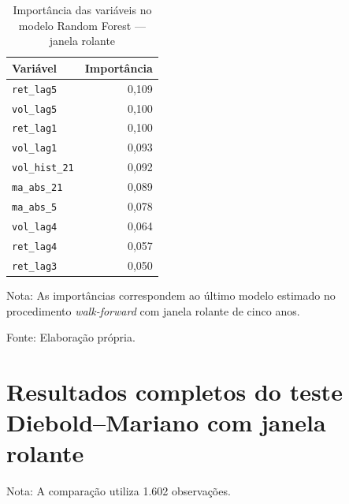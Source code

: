 \begin{table}[H]
    \centering
    \caption{Importância das variáveis no modelo Random Forest --- janela rolante}
    \label{tab:importancia_rf_rolante}
    \begin{tabular}{lr}
        \toprule
        Variável & Importância \\
        \midrule
        \texttt{ret\_lag5}    & 0,109 \\
        \texttt{vol\_lag5}    & 0,100 \\
        \texttt{ret\_lag1}    & 0,100 \\
        \texttt{vol\_lag1}    & 0,093 \\
        \texttt{vol\_hist\_21} & 0,092 \\
        \texttt{ma\_abs\_21}  & 0,089 \\
        \texttt{ma\_abs\_5}   & 0,078 \\
        \texttt{vol\_lag4}    & 0,064 \\
        \texttt{ret\_lag4}    & 0,057 \\
        \texttt{ret\_lag3}    & 0,050 \\
        \bottomrule
    \end{tabular}
    \begin{center}
        \footnotesize 
        Nota: As importâncias correspondem ao último modelo estimado no procedimento 
        \textit{walk-forward} com janela rolante de cinco anos.
        
        Fonte: Elaboração própria.
    \end{center}
\end{table}

\FloatBarrier
\section{Resultados completos do teste Diebold–Mariano com janela rolante}

\begin{table}[H]
    \centering
    \caption{Resultados completos do teste Diebold--Mariano para MSE --- janela rolante}
    \label{tab:dm_mse_rolante_completo}
    \small
    \par\vspace{2pt}
    {\footnotesize Nota: A comparação utiliza 1.602 observações.\par}
\end{table}

